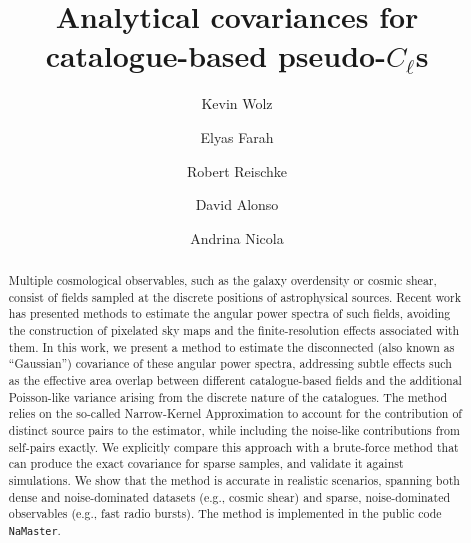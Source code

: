 \documentclass[%
 reprint,
superscriptaddress,
nofootinbib,
 amsmath,amssymb,
 aps,
 prd,
]{revtex4-2}
\newcommand{\nmt}{{\tt NaMaster}\xspace}
\begin{document}
\title{Analytical covariances for catalogue-based pseudo-\texorpdfstring{$C_\ell$}{CL}s}

\author{Kevin Wolz}
\author{Elyas Farah}
\author{Robert Reischke}
\author{David Alonso}
\author{Andrina Nicola}

\begin{abstract}
  Multiple cosmological observables, such as the galaxy overdensity or cosmic shear, consist of fields sampled at the discrete positions of astrophysical sources. Recent work has presented methods to estimate the angular power spectra of such fields, avoiding the construction of pixelated sky maps and the finite-resolution effects associated with them. In this work, we present a method to estimate the disconnected (also known as ``Gaussian'') covariance of these angular power spectra, addressing subtle effects such as the effective area overlap between different catalogue-based fields and the additional Poisson-like variance arising from the discrete nature of the catalogues. The method relies on the so-called Narrow-Kernel Approximation to account for the contribution of distinct source pairs to the estimator, while including the noise-like contributions from self-pairs exactly. We explicitly compare this approach with a brute-force method that can produce the exact covariance for sparse samples, and validate it against simulations. We show that the method is accurate in realistic scenarios, spanning both dense and noise-dominated datasets (e.g., cosmic shear) and sparse, noise-dominated observables (e.g., fast radio bursts). The method is implemented in the public code \nmt.
\end{abstract}

\maketitle
\end{document}

